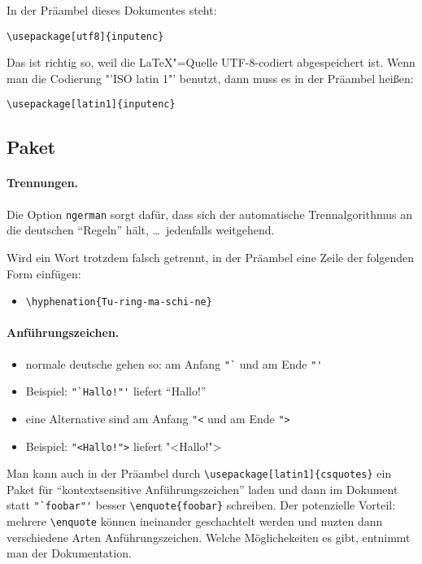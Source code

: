 In der Präambel dieses Dokumentes steht:

\verb|\usepackage[utf8]{inputenc}|

Das ist richtig so, weil die \LaTeX"=Quelle UTF-8-codiert abgespeichert
ist. Wenn man die Codierung "'ISO latin 1"' benutzt, dann muss es in der
Präambel heißen:

\verb|\usepackage[latin1]{inputenc}|

\subsection{Paket }

\paragraph{Trennungen.}

Die Option \verb|ngerman| sorgt dafür, dass sich der automatische
Trennalgorithmus an die deutschen "`Regeln"' hält, \dots\ jedenfalls weitgehend.

Wird ein Wort trotzdem falsch getrennt, in der Präambel eine Zeile der
folgenden Form einfügen:
\begin{itemize}
\item \verb|\hyphenation{Tu-ring-ma-schi-ne}|
\end{itemize}

\paragraph{Anführungszeichen.}
%
\begin{itemize}[noitemsep]
\item normale deutsche gehen so: am Anfang \verb|"`| und am Ende \verb|"'|
\item Beispiel: \verb|"`Hallo!"'| liefert "`Hallo!"'
\item eine Alternative sind am Anfang \verb|"<| und am Ende \verb|">|
\item Beispiel: \verb|"<Hallo!">| liefert "<Hallo!">
\end{itemize}
%
Man kann auch in der Präambel durch
\verb|\usepackage[latin1]{csquotes}| ein Paket für "`kontextsensitive
Anführungszeichen"' laden und dann im Dokument statt \verb|"`foobar"'|
besser \verb|\enquote{foobar}| schreiben.
%
Der potenzielle Vorteil: mehrere \verb|\enquote| können ineinander
geschachtelt werden und nuzten dann verschiedene Arten
Anführungszeichen.
%
Welche Möglichekeiten es gibt, entnimmt man der Dokumentation.


